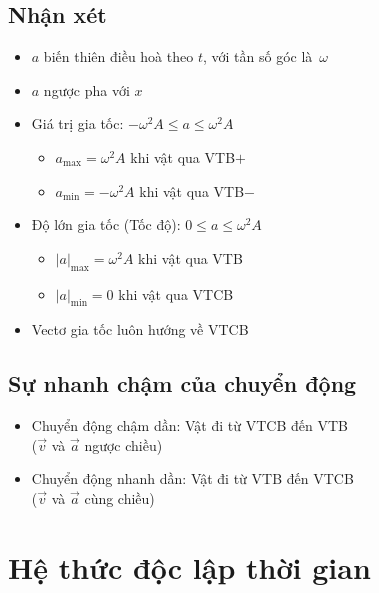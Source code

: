 \documentclass[12pt]{article}
\begin{document}
	\subsection{Nhận xét}
		\vspace{5pt}
		\begin{itemize}
			\item \(a\) biến thiên điều hoà theo \(t\), với tần số góc là \(\,\omega\)
			\item \(a\) ngược pha với \(x\)
			\item Giá trị gia tốc: \quad \( -\omega^2 A \leq a \leq \omega^2 A \)
				\begin{itemize}[label=\textopenbullet]
					\item \( a_\text{max} = \omega^2 A \) khi vật qua VTB\(+\)
					\item \( a_\text{min} = - \omega^2 A \) khi vật qua VTB\(-\)
				\end{itemize}
			\item Độ lớn gia tốc (Tốc độ): \quad \( 0 \leq a \leq \omega^2 A \)
				\begin{itemize}[label=\textopenbullet]
					\item \( {\lvert a \rvert}_\text{max} = \omega^2 A \) khi vật qua VTB
					\item \( {\lvert a \rvert}_\text{min} = 0 \) khi vật qua VTCB
				\end{itemize}
			\item Vectơ gia tốc luôn hướng về VTCB
		\end{itemize}
	\newpage
	\subsection{Sự nhanh chậm của chuyển động}
		\vspace{5pt}
		\begin{itemize}
			\item Chuyển động chậm dần: Vật đi từ VTCB đến VTB \\ (\(\vec{v}\) và \(\vec{a}\) ngược chiều)
			\item Chuyển động nhanh dần: Vật đi từ VTB đến VTCB \\ (\(\vec{v}\) và \(\vec{a}\) cùng chiều)
		\end{itemize}

\vspace{4pt}
\section{Hệ thức độc lập thời gian}
\end{document}
